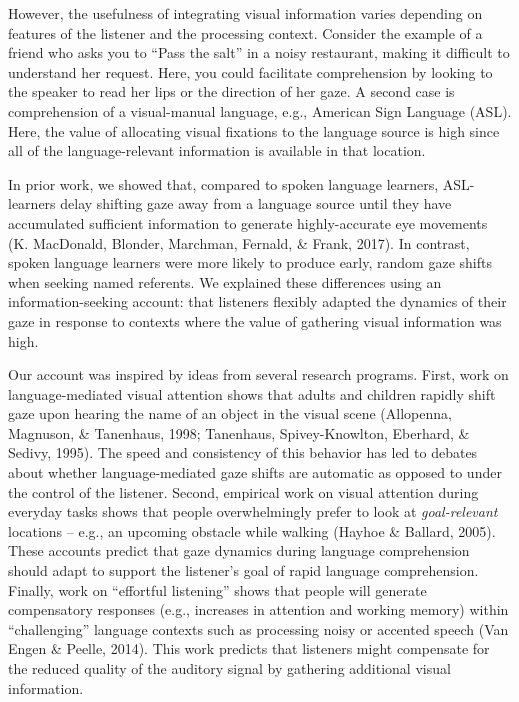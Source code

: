 \documentclass[10pt, letterpaper]{article}
\begin{document}
However, the usefulness of integrating visual information varies
depending on features of the listener and the processing context.
Consider the example of a friend who asks you to ``Pass the salt'' in a
noisy restaurant, making it difficult to understand her request. Here,
you could facilitate comprehension by looking to the speaker to read her
lips or the direction of her gaze. A second case is comprehension of a
visual-manual language, e.g., American Sign Language (ASL). Here, the
value of allocating visual fixations to the language source is high
since all of the language-relevant information is available in that
location.

In prior work, we showed that, compared to spoken language learners,
ASL-learners delay shifting gaze away from a language source until they
have accumulated sufficient information to generate highly-accurate eye
movements (K. MacDonald, Blonder, Marchman, Fernald, \& Frank, 2017). In
contrast, spoken language learners were more likely to produce early,
random gaze shifts when seeking named referents. We explained these
differences using an information-seeking account: that listeners
flexibly adapted the dynamics of their gaze in response to contexts
where the value of gathering visual information was high.

Our account was inspired by ideas from several research programs. First,
work on language-mediated visual attention shows that adults and
children rapidly shift gaze upon hearing the name of an object in the
visual scene (Allopenna, Magnuson, \& Tanenhaus, 1998; Tanenhaus,
Spivey-Knowlton, Eberhard, \& Sedivy, 1995). The speed and consistency
of this behavior has led to debates about whether language-mediated gaze
shifts are automatic as opposed to under the control of the listener.
Second, empirical work on visual attention during everyday tasks shows
that people overwhelmingly prefer to look at \emph{goal-relevant}
locations -- e.g., an upcoming obstacle while walking (Hayhoe \&
Ballard, 2005). These accounts predict that gaze dynamics during
language comprehension should adapt to support the listener's goal of
rapid language comprehension. Finally, work on ``effortful listening''
shows that people will generate compensatory responses (e.g., increases
in attention and working memory) within ``challenging'' language
contexts such as processing noisy or accented speech (Van Engen \&
Peelle, 2014). This work predicts that listeners might compensate for
the reduced quality of the auditory signal by gathering additional
visual information.
\end{document}
